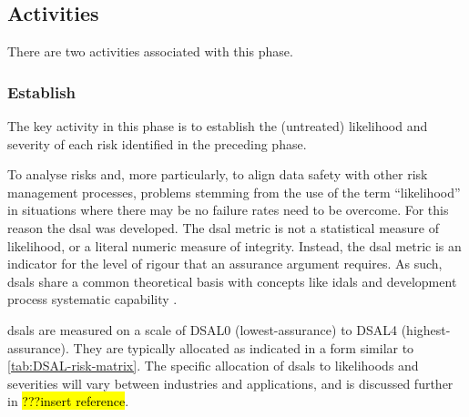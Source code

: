 \subsection{Activities}
There are two activities associated with this phase.
%
\subsubsection{Establish }
\label{bkm:DSAL-table-section}
The key activity in this phase is to establish the (untreated) likelihood and severity of each risk identified in the preceding phase.

To analyse risks and, more particularly, to align data safety with other risk management processes, problems stemming from the use of the term ``likelihood'' in situations where there may be no failure rates need to be overcome. For this reason the \gls{dsal} was developed. The \gls{dsal} metric is not a statistical measure of likelihood, or a literal numeric measure of \gls{integrity}. Instead, the \gls{dsal} metric is an indicator for the level of rigour that an assurance argument requires. As such, \glspl{dsal} share a common theoretical basis with concepts like \glspl{idal}  \cite{citation:arp4754a2010guidelines} and development process systematic capability \cite{citation:iec615083}.

\glspl{dsal} are measured on a scale of DSAL0 (lowest-assurance) to DSAL4 (highest-assurance). They are typically allocated as indicated in a form similar to  \autoref{tab:DSAL-risk-matrix}. \cbstart The specific allocation of \glspl{dsal} to likelihoods and severities will vary between industries and applications, and is discussed further in \hl{???insert reference}.\cbend

